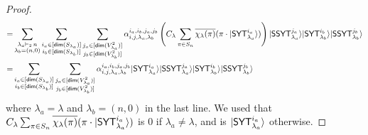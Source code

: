 \documentclass[11pt]{article}
\DeclarePairedDelimiter\ket{\lvert}{\rangle}
\begin{document}
\begin{proof}
\begin{align*}
    =& \sum_{\substack{\lambda_a \vdash_2\, n \\ \lambda_b=(n,0)}} \sum_{\substack{i_a \in [\mathsf{dim}(S_{\lambda_a})] \\i_b \in [\mathsf{dim}(S_{\lambda_b})]}}  \sum_{\substack{j_a \in [\mathsf{dim}(V^2_{\lambda_a})] \\j_b \in [\mathsf{dim}(V^2_{\lambda_b})]}}\alpha_{i, j, \lambda_a, \lambda_b}^{i_a, i_b, j_a, j_b} \left(C_{\lambda}\sum_{\pi\in S_n} \overline{\chi_{\lambda}(\pi)}(\pi\cdot \ket{\mathsf{SYT}_{\lambda_a}^{i_a}})\right)\ket{\mathsf{SSYT}_{\lambda_a}^{j_a}} \ket{\mathsf{SYT}_{\lambda_b}^{i_b}}\ket{\mathsf{SSYT}_{\lambda_b}^{j_b}}  \\
    =& \sum_{\substack{i_a \in [\mathsf{dim}(S_{\lambda_a})] \\i_b \in [\mathsf{dim}(S_{\lambda_b})]}}  \sum_{\substack{j_a \in [\mathsf{dim}(V^2_{\lambda_a})] \\j_b \in [\mathsf{dim}(V^2_{\lambda_b})]}}\alpha_{i, j, \lambda_a, \lambda_b}^{i_a, i_b, j_a, j_b} \ket{\mathsf{SYT}_{\lambda_a}^{i_a}} \ket{\mathsf{SSYT}_{\lambda_a}^{j_a}} \ket{\mathsf{SYT}_{\lambda_b}^{i_b}}\ket{\mathsf{SSYT}_{\lambda_b}^{j_b}} 
    \end{align*}
    where $\lambda_a=\lambda$ and $\lambda_b=(n,0)$ in the last line. We used that $C_{\lambda}\sum_{\pi\in S_n} \overline{\chi_{\lambda}(\pi)}(\pi\cdot \ket{\mathsf{SYT}_{\lambda_a}^{i_a}})$ is $0$ if $\lambda_a\ne \lambda$, and is $\ket{\mathsf{SYT}_{\lambda_a}^{i_a}}$ otherwise.
\end{proof}
\end{document}
